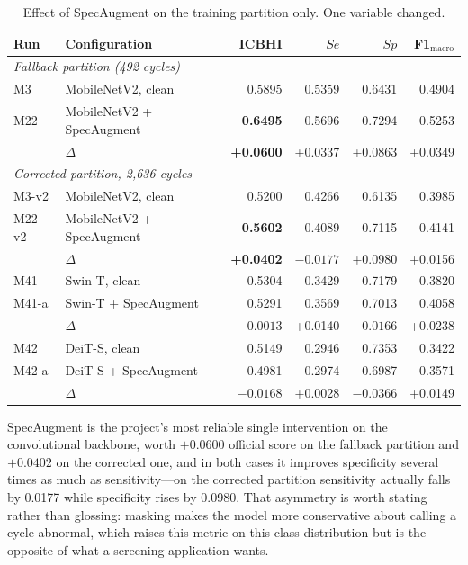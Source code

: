 \documentclass[journal,onecolumn]{IEEEtran}
\newcommand{\best}[1]{\textbf{#1}}
\begin{document}
\begin{table}[!t]
\centering
\caption{Effect of SpecAugment on the training partition only. One variable changed.}
\label{tab:augmentation}
\begin{tabular}{llrrrr}
\toprule
Run & Configuration & ICBHI & $Se$ & $Sp$ & F1$_{\text{macro}}$ \\
\midrule
\multicolumn{6}{l}{\emph{Fallback partition (492 cycles)}}\\
M3     & MobileNetV2, clean        & 0.5895 & 0.5359 & 0.6431 & 0.4904 \\
M22    & MobileNetV2 + SpecAugment & \best{0.6495} & 0.5696 & 0.7294 & 0.5253 \\
       & $\Delta$                  & \best{+0.0600} & +0.0337 & +0.0863 & +0.0349 \\
\midrule
\multicolumn{6}{l}{\emph{Corrected partition, 2{,}636 cycles}}\\
M3-v2  & MobileNetV2, clean        & 0.5200 & 0.4266 & 0.6135 & 0.3985 \\
M22-v2 & MobileNetV2 + SpecAugment & \best{0.5602} & 0.4089 & 0.7115 & 0.4141 \\
       & $\Delta$                  & \best{+0.0402} & $-0.0177$ & +0.0980 & +0.0156 \\
\midrule
M41    & Swin-T, clean             & 0.5304 & 0.3429 & 0.7179 & 0.3820 \\
M41-a  & Swin-T + SpecAugment      & 0.5291 & 0.3569 & 0.7013 & 0.4058 \\
       & $\Delta$                  & $-0.0013$ & +0.0140 & $-0.0166$ & +0.0238 \\
\midrule
M42    & DeiT-S, clean             & 0.5149 & 0.2946 & 0.7353 & 0.3422 \\
M42-a  & DeiT-S + SpecAugment      & 0.4981 & 0.2974 & 0.6987 & 0.3571 \\
       & $\Delta$                  & $-0.0168$ & +0.0028 & $-0.0366$ & +0.0149 \\
\bottomrule
\end{tabular}
\end{table}

SpecAugment is the project's most reliable single intervention on the convolutional
backbone, worth $+0.0600$ official score on the fallback partition and $+0.0402$ on the
corrected one, and in both cases it improves specificity several times as much as
sensitivity---on the corrected partition sensitivity actually falls by 0.0177 while
specificity rises by 0.0980. That asymmetry is worth stating rather than glossing:
masking makes the model more conservative about calling a cycle abnormal, which raises
this metric on this class distribution but is the opposite of what a screening
application wants.
\end{document}
